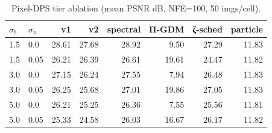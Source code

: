 \begin{table}[h]
  \centering
  \caption{Pixel-DPS tier ablation (mean PSNR dB, NFE=100, 50 imgs/cell).}
  \label{tab:tier_pixel}
  \begin{tabular}{llrrrrrr}
    \toprule
    $\sigma_b$ & $\sigma_n$ & v1 & v2 & spectral & Π-GDM & ζ-sched & particle \\
    \midrule
    1.5 & 0.0 & 28.61 & 27.68 & 28.92 & 9.50 & 27.29 & 11.83 \\
    1.5 & 0.05 & 26.21 & 26.39 & 26.61 & 19.61 & 24.47 & 11.82 \\
    3.0 & 0.0 & 27.15 & 26.24 & 27.55 & 7.94 & 26.48 & 11.83 \\
    3.0 & 0.05 & 26.25 & 25.68 & 27.01 & 19.86 & 27.05 & 11.83 \\
    5.0 & 0.0 & 26.21 & 25.25 & 26.36 & 7.55 & 25.56 & 11.81 \\
    5.0 & 0.05 & 25.33 & 24.58 & 26.03 & 16.67 & 26.17 & 11.82 \\
    \bottomrule
  \end{tabular}
\end{table}
